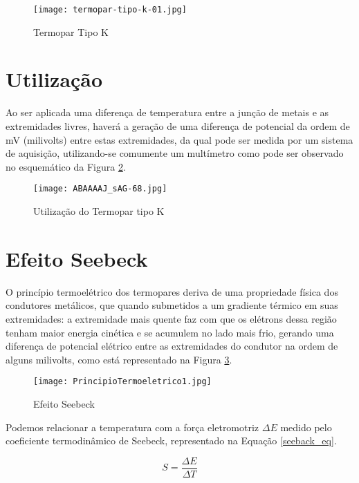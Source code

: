 \documentclass[a4paper,12pt]{report}
\begin{document}
	\begin{figure}[htbp]
		\centering
		\texttt{[image: termopar-tipo-k-01.jpg]}
		\caption{Termopar Tipo K}
		\label{real}
	\end{figure}
	
	\section{Utilização}
	Ao ser aplicada uma diferença de temperatura entre a junção de metais e as extremidades livres, haverá a geração de uma diferença de potencial da ordem de mV (milivolts) entre estas extremidades, da qual pode ser medida por um sistema de aquisição, utilizando-se comumente um multímetro como pode ser observado no esquemático da Figura \ref{esquematico}.
	
	\hfill \break
	\hfill \break
	
	\begin{figure}[htbp]
		\centering
		\texttt{[image: ABAAAAJ\_sAG-68.jpg]}
		\caption{Utilização do Termopar tipo K}
		\label{esquematico}
	\end{figure}
	
	\pagebreak
	
	\section{Efeito Seebeck}
	
	O princípio termoelétrico dos termopares deriva de uma propriedade física dos condutores metálicos, que quando  submetidos a um gradiente térmico em suas extremidades: a extremidade mais quente faz com que os elétrons dessa região tenham maior energia cinética e se acumulem no lado mais frio, gerando uma diferença de potencial elétrico entre as extremidades do condutor na ordem de alguns milivolts, como está representado na Figura \ref{seebeck}.
	
	\begin{figure}[htbp]
		\centering
		\texttt{[image: PrincipioTermoeletrico1.jpg]}
		\caption{Efeito Seebeck}
		\label{seebeck}
	\end{figure}
	
	\noindent Podemos relacionar a temperatura com a força eletromotriz $\Delta E$ medido pelo coeficiente termodinâmico de Seebeck, representado na Equação \ref{seeback_eq}.
	
	\begin{equation}
	S = \frac{\Delta E}{\Delta T}
	\label{seeback_eq}
	\end{equation}  
	
\end{document}

